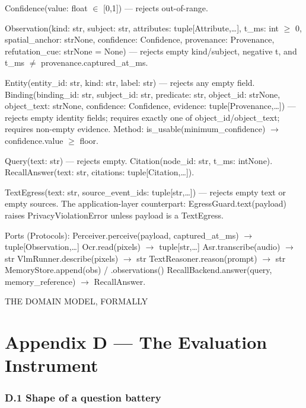 Confidence(value: float \(\in\) {[}0,1{]}) --- rejects out-of-range.

Observation(kind: str, subject: str, attributes: tuple{[}Attribute,\ldots{]}, t\_ms: int \(\geq\) 0, spatial\_anchor: str\textbar None, confidence: Confidence, provenance: Provenance, refutation\_cue: str\textbar None = None) --- rejects empty kind/subject, negative t, and t\_ms \(\neq\) provenance.captured\_at\_ms.

Entity(entity\_id: str, kind: str, label: str) --- rejects any empty field. Binding(binding\_id: str, subject\_id: str, predicate: str, object\_id: str\textbar None, object\_text: str\textbar None, confidence: Confidence, evidence: tuple{[}Provenance,\ldots{]}) --- rejects empty identity fields; requires exactly one of object\_id/object\_text; requires non-empty evidence. Method: is\_usable(minimum\_confidence) \(\rightarrow\) confidence.value \(\geq\) floor.

Query(text: str) --- rejects empty. Citation(node\_id: str, t\_ms: int\textbar None). RecallAnswer(text: str, citations: tuple{[}Citation,\ldots{]}).

TextEgress(text: str, source\_event\_ids: tuple{[}str,\ldots{]}) --- rejects empty text or empty sources. The application-layer counterpart: EgressGuard.text(payload) raises PrivacyViolationError unless payload is a TextEgress.

Ports (Protocols): Perceiver.perceive(payload, captured\_at\_ms) \(\rightarrow\) tuple{[}Observation,\ldots{]} \textperiodcentered{} Ocr.read(pixels) \(\rightarrow\) tuple{[}str,\ldots{]} \textperiodcentered{} Asr.transcribe(audio) \(\rightarrow\) str \textperiodcentered{} VlmRunner.describe(pixels) \(\rightarrow\) str \textperiodcentered{} TextReasoner.reason(prompt) \(\rightarrow\) str \textperiodcentered{} MemoryStore.append(obs) / .observations() \textperiodcentered{} RecallBackend.answer(query, memory\_reference) \(\rightarrow\) RecallAnswer.

THE DOMAIN MODEL, FORMALLY

\chapter*{Appendix D --- The Evaluation Instrument}\label{appendix-d-the-evaluation-instrument}

\subsection{D.1 Shape of a question battery}\label{d.1-shape-of-a-question-battery}


